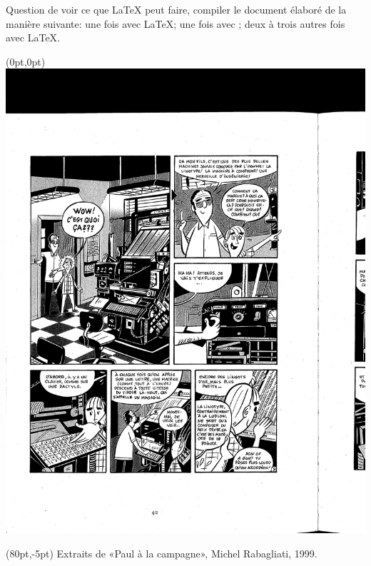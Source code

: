 \begin{exercice}[nosol]
  Question de voir ce que {\LaTeX} peut faire, compiler le document
  élaboré  de la manière suivante: une
  fois avec {\LaTeX}; une fois avec {\BibTeX}; deux à trois autres
  fois avec {\LaTeX}.
\end{exercice}

\newpage

\begingroup
\pagestyle{plain}
\setlength{\parindent}{0mm}
\textblockorigin{86pt}{118.5pt}

\begin{textblock*}{440pt}(0pt,0pt)
  \includegraphics[angle=180]{paul-apprenti-typographe/paul-page_1}
\end{textblock*}
\begin{textblock*}{440pt}(80pt,-5pt)
  \small\sffamily%
  Extraits de «Paul à la campagne», {\textcopyright} Michel
  Rabagliati, 1999.
\end{textblock*}
